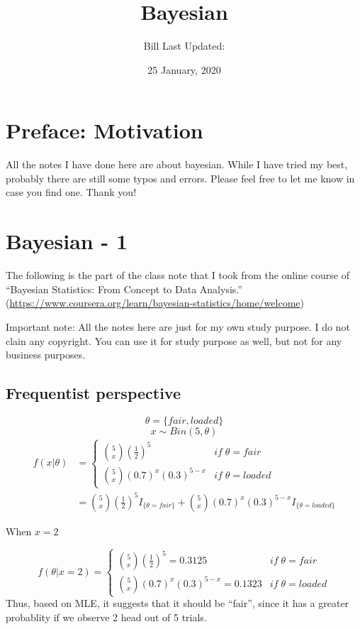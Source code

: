 \documentclass[]{book}
\title{Bayesian}
\author{Bill Last Updated:}
\date{25 January, 2020}
\begin{document}
\maketitle

{
\setcounter{tocdepth}{1}
\tableofcontents
}
\hypertarget{my-section}{%
\chapter*{Preface: Motivation}\label{my-section}}

All the notes I have done here are about bayesian. While I have tried my best, probably there are still some typos and errors. Please feel free to let me know in case you find one. Thank you!

\hypertarget{bayesian---1}{%
\chapter{Bayesian - 1}\label{bayesian---1}}

The following is the part of the class note that I took from the online course of ``Bayesian Statistics: From Concept to Data Analysis.'' (\url{https://www.coursera.org/learn/bayesian-statistics/home/welcome})

Important note: All the notes here are just for my own study purpose. I do not clain any copyright. You can use it for study purpose as well, but not for any business purposes.

\hypertarget{frequentist-perspective}{%
\section{Frequentist perspective}\label{frequentist-perspective}}

\[\theta = \{ fair , loaded \}\]
\[x \sim Bin (5, \theta)\]
\[\begin{aligned} f(x|\theta) &=\begin{cases} \binom{5}{x} (\frac{1}{2})^5 & if \; \theta=fair  \\ \binom{5}{x} (0.7)^x(0.3)^{5-x} & if \;  \theta=loaded  \end{cases} \\ &= \binom{5}{x} (\frac{1}{2})^5 I_{\{\theta=fair \}}+\binom{5}{x} (0.7)^x(0.3)^{5-x}I_{\{\theta=loaded \}}\end{aligned}\]

When \(x=2\)

\[f(\theta | x=2)=\begin{cases} \binom{5}{x} (\frac{1}{2})^5 = 0.3125& if \; \theta=fair  \\ \binom{5}{x} (0.7)^x(0.3)^{5-x} = 0.1323& if \;  \theta=loaded  \end{cases}\]
Thus, based on MLE, it suggests that it should be ``fair'', since it has a greater probablity if we observe 2 head out of 5 trials.
\end{document}
